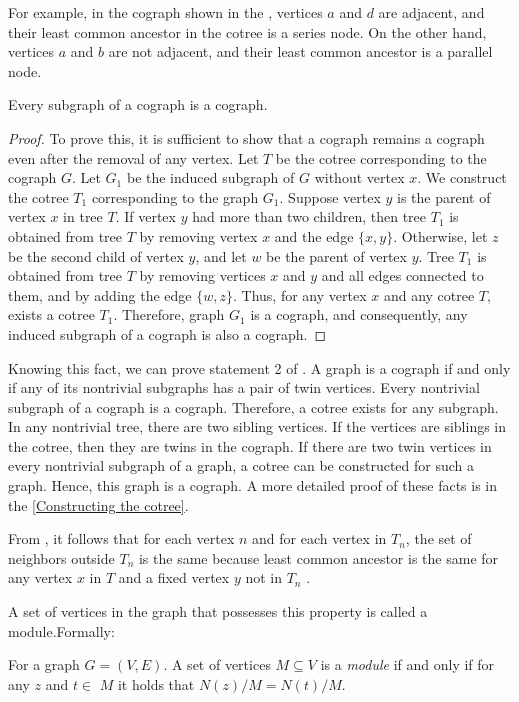For example, in the cograph shown in the , vertices $a$ and $d$ are adjacent, and their least common ancestor in the cotree is a series node. On the other hand, vertices $a$ and $b$ are not adjacent, and their least common ancestor is a parallel node.

\begin{theorem}
    Every subgraph of a cograph is a cograph.
\end{theorem}

\begin{proof}
    To prove this, it is sufficient to show that a cograph remains a cograph even after the removal of any vertex. Let $T$ be the cotree corresponding to the cograph $G$. Let $G_1$ be the induced subgraph of $G$ without vertex $x$. We construct the cotree $T_1$ corresponding to the graph $G_1$.
Suppose vertex $y$ is the parent of vertex $x$ in tree $T$. If vertex $y$ had more than two children, then tree $T_1$ is obtained from tree $T$ by removing vertex $x$ and the edge $\{x,y\}$.
Otherwise, let $z$ be the second child of vertex $y$, and let $w$ be the parent of vertex $y$. Tree $T_1$ is obtained from tree $T$ by removing vertices $x$ and $y$ and all edges connected to them, and by adding the edge $\{w,z\}$. Thus, for any vertex $x$ and any cotree $T$, exists a cotree $T_1$. Therefore, graph $G_1$ is a cograph, and consequently, any induced subgraph of a cograph is also a cograph.
\end{proof}

Knowing this fact, we can prove statement 2 of . A graph is a cograph if and only if any of its nontrivial subgraphs has a pair of twin vertices.
Every nontrivial subgraph of a cograph is a cograph. Therefore, a cotree exists for any subgraph. In any nontrivial tree, there are two sibling vertices. If the vertices are siblings in the cotree, then they are twins in the cograph. If there are two twin vertices in every nontrivial subgraph of a graph, a cotree can be constructed for such a graph. Hence, this graph is a cograph.
A more detailed proof of these facts is in the \cref{Constructing the cotree}.

From , it follows that for each vertex $n$ and for each vertex in $T_n$, the set of neighbors outside $T_n$ is the same because least common ancestor is the same for any vertex $x$ in $T$ and a fixed vertex $y$ not in $T_n$ .  

A set of vertices in the graph that possesses this property is called a module.Formally:
\begin{definition} 
For a graph $G=(V,E)$. A set of vertices $M \subseteq V$ is a \emph{module} if and only if for any $z$ and $t \in$  $M$ it holds that $N(z)/M=N(t)/M$.
\end{definition}

